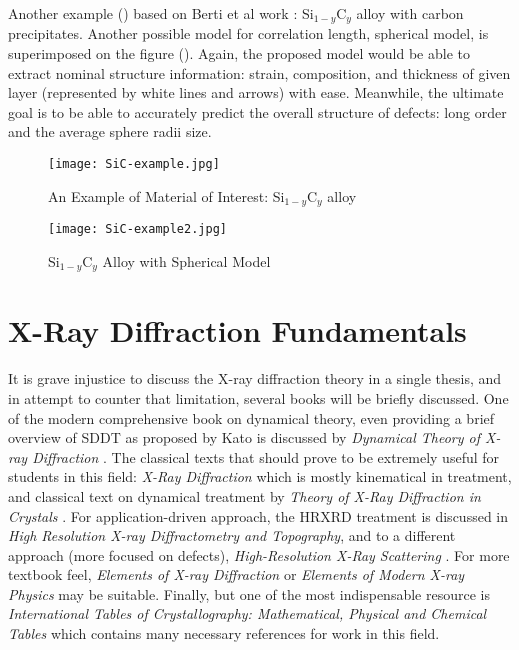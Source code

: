 Another example () based on Berti et al work \cite{Berti2}:  Si$_{1-y}$C$_y$ alloy with carbon precipitates.  Another possible model for correlation length, spherical model, is superimposed on the figure ().  Again, the proposed model would be able to extract nominal structure information:  strain, composition, and thickness of given layer (represented by white lines and arrows) with ease.  Meanwhile, the ultimate goal is to be able to accurately predict the overall structure of defects:  long order and the average sphere radii size.

\begin{figure}[h]
\caption{An Example of Material of Interest: Si$_{1-y}$C$_y$ alloy}
\label{SiC-example}
\centering
\texttt{[image: SiC-example.jpg]}
\end{figure}


\begin{figure}[h]
\caption{Si$_{1-y}$C$_y$ Alloy with Spherical Model}
\label{SiC-example2}
\centering
\texttt{[image: SiC-example2.jpg]}
\end{figure}

\chapter{X-Ray Diffraction Fundamentals}

It is grave injustice to discuss the X-ray diffraction theory in a single thesis, and in attempt to counter that limitation, several books will be briefly discussed.  One of the modern comprehensive book on dynamical theory, even providing a brief overview of SDDT as proposed by Kato is discussed by {\textit{Dynamical Theory of X-ray Diffraction}} \cite{Authier1}.  The classical texts that should prove to be extremely useful for students in this field:  {\textit{X-Ray Diffraction}} \cite{Warren1} which is mostly kinematical in treatment, and classical text on dynamical treatment by {\textit{Theory of X-Ray Diffraction in Crystals}} \cite{Zachariasen1}.  For application-driven approach, the HRXRD treatment is discussed in  {\textit{High Resolution X-ray Diffractometry and Topography}}\cite{Tanner1}, and to a different approach (more focused on defects), {\textit{High-Resolution X-Ray Scattering}} \cite{Holy2}.  For more textbook feel,  {\textit{Elements of X-ray Diffraction}} \cite{Cullity1} or {\textit{Elements of Modern X-ray Physics}} \cite{Als1} may be suitable.  Finally, but one of the most indispensable resource is {\textit{International Tables of Crystallography: Mathematical, Physical and Chemical Tables}} \cite{ ITC3} which contains many necessary references for work in this field.


